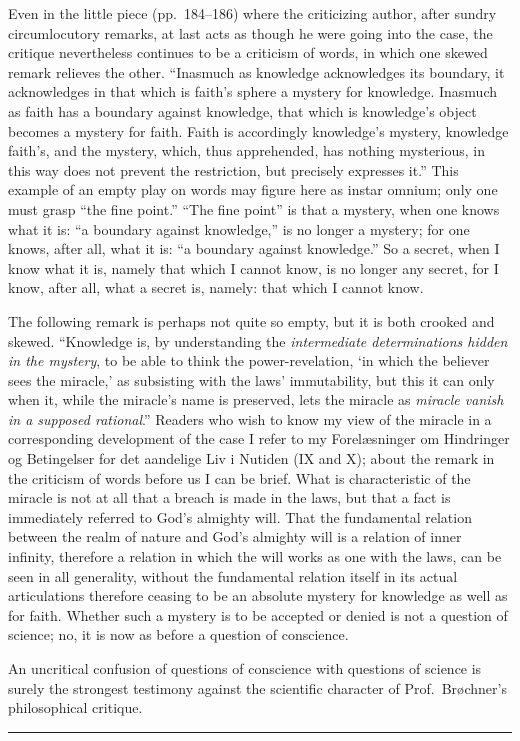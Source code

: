 \documentclass[12pt]{book}
\newcommand{\opage}[1]{\marginnote{\footnotesize\textit{[#1]}}}
\begin{document}
\opage{51}\setcounter{footnote}{0}%
Even in the little piece (pp.\ 184--186) where the criticizing author, after
sundry circumlocutory remarks, at last acts as though he were going into the
case, the critique nevertheless continues to be a criticism of words, in
which one skewed remark relieves the other. ``Inasmuch as knowledge
acknowledges its boundary, it acknowledges in that which is faith's sphere a
mystery for knowledge. Inasmuch as faith has a boundary against knowledge,
that which is knowledge's object becomes a mystery for faith. Faith is
accordingly knowledge's mystery, knowledge faith's, and the mystery, which,
thus apprehended, has nothing mysterious, in this way does not prevent the
restriction, but precisely expresses it.'' This example of an empty play on
words may figure here as instar omnium; only one must grasp ``the fine
point.'' ``The fine point'' is that a mystery, when one knows what it is: ``a
boundary against knowledge,'' is no longer a mystery; for one knows, after
all, what it is: ``a boundary against knowledge.'' So a secret, when I know
what it is, namely that which I cannot know, is no longer any secret, for I
know, after all, what a secret is, namely: that which I cannot know.

The following remark is perhaps not quite so empty, but it is both crooked
and skewed. ``Knowledge is, by understanding the \emph{intermediate
determinations hidden in the mystery}, to be able to think the
power-revelation, `in which the believer sees the miracle,' as subsisting
with the laws' immutability, but this it can only
\opage{52}\setcounter{footnote}{0}%
when it, while the miracle's name is preserved, lets the miracle as
\emph{miracle vanish in a supposed rational}.'' Readers who wish to know my
view of the miracle in a corresponding development of the case I refer to my
Forelæsninger om Hindringer og Betingelser for det aandelige Liv i Nutiden
(IX and X); about the remark in the criticism of words before us I can be
brief. What is characteristic of the miracle is not at all that a breach is
made in the laws, but that a fact is immediately referred to God's almighty
will. That the fundamental relation between the realm of nature and God's
almighty will is a relation of inner infinity, therefore a relation in which
the will works as one with the laws, can be seen in all generality, without
the fundamental relation itself in its actual articulations therefore
ceasing to be an absolute mystery for knowledge as well as for faith.
Whether such a mystery is to be accepted or denied is not a question of
science; no, it is now as before a question of conscience.

An uncritical confusion of questions of conscience with questions of
science is surely the strongest testimony against the scientific character
of Prof.\ Brøchner's philosophical critique.

\begin{center}\rule{3cm}{0.4pt}\end{center}
\end{document}
